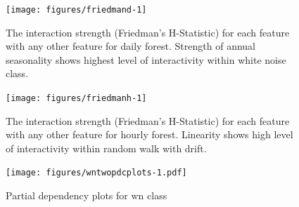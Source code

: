 \documentclass[11pt,a4paper,]{article}
\begin{document}
\begin{figure}[h]

{\centering \texttt{[image: figures/friedmand-1]} 

}

\caption{The interaction strength (Friedman's H-Statistic) for each feature with any other feature for daily forest. Strength of annual seasonality shows highest level of interactivity within white noise class.}\label{fig:friedmand}
\end{figure}

\begin{figure}[h]

{\centering \texttt{[image: figures/friedmanh-1]} 

}

\caption{The interaction strength (Friedman's H-Statistic) for each feature with any other feature for hourly forest. Linearity shows high level of interactivity within random walk with drift.}\label{fig:friedmanh}
\end{figure}

\clearpage

\begin{figure}
\centering
\texttt{[image: figures/wntwopdcplots-1.pdf]}
\caption{\label{fig:wntwopdcplots}Partial dependency plots for wn class}
\end{figure}

\printbibliography[title=References]
\end{document}
